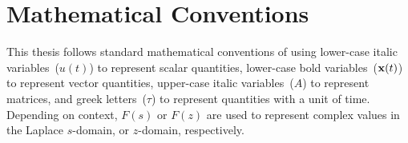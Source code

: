 \cleardoublepage
{}
\renewcommand\contentsname{Table of Contents}
\tableofcontents
\cleardoublepage
{}

\listoftodos
\cleardoublepage
{}

\listoftables
\cleardoublepage
{}

\listoffigures
\cleardoublepage
{}

\listoftheorems[ignoreall,show={theorem,lemma}]
\cleardoublepage
{}

\chapter*{Mathematical Conventions}
\label{typography}

This thesis follows standard mathematical conventions of using lower-case italic variables~($u(t)$) to represent scalar quantities, lower-case bold variables~($\mathbf{x}(t)$) to represent vector quantities, upper-case italic variables~($A$) to represent matrices, and greek letters~($\tau$) to represent quantities with a unit of time.
Depending on context, $F(s)$ or $F(z)$ are used to represent complex values in the Laplace $s$-domain, or $z$-domain, respectively.

\cleardoublepage
{}

